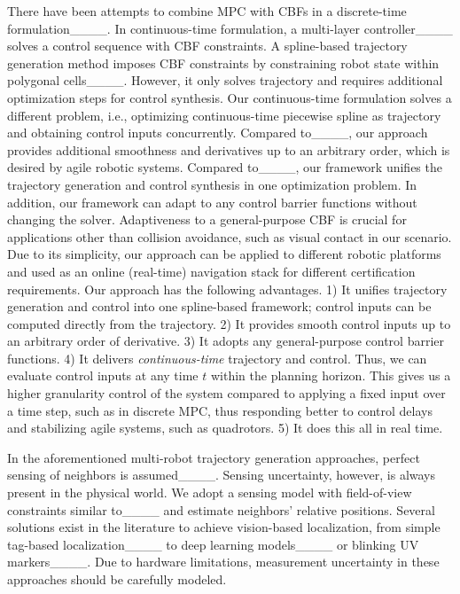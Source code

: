 There have been attempts to combine MPC with CBFs in a discrete-time formulation____. In continuous-time formulation, a multi-layer controller____ solves a control sequence with CBF constraints. A spline-based trajectory generation method imposes CBF constraints by constraining robot state within polygonal cells____. However, it only solves trajectory and requires additional optimization steps for control synthesis. 
Our continuous-time formulation solves a different problem, i.e., optimizing continuous-time piecewise spline as trajectory and obtaining control inputs concurrently. Compared to____, our approach provides additional smoothness and derivatives up to an arbitrary order, which is desired by agile robotic systems. Compared to____, our framework unifies the trajectory generation and control synthesis in one optimization problem. In addition, our framework can adapt to any control barrier functions without changing the solver. Adaptiveness to a general-purpose CBF is crucial for applications other than collision avoidance, such as visual contact in our scenario. Due to its simplicity, our approach can be applied to different robotic platforms and used as an online (real-time) navigation stack for different certification requirements.
Our approach has the following advantages. 1) It unifies  trajectory generation and control into one spline-based framework; control inputs can be computed directly from the trajectory. 2) It provides smooth control inputs up to an arbitrary order of derivative. 3) It adopts any general-purpose control barrier functions. 4) It delivers \emph{continuous-time} trajectory and control. Thus, we can evaluate control inputs at any time $t$ within the planning horizon. This gives us a higher granularity control of the system compared to applying a fixed input over a time step, such as in discrete MPC, thus responding better to control delays and stabilizing agile systems, such as quadrotors. 5) It does this all in real time. 

In the aforementioned multi-robot trajectory generation approaches, perfect sensing of neighbors is assumed____. Sensing uncertainty, however, is always present in the physical world. We adopt a sensing model with field-of-view constraints similar to____ and estimate neighbors' relative positions. Several solutions exist in the literature to achieve vision-based localization, from simple tag-based localization____ to deep learning models____ or blinking UV markers____. Due to hardware limitations, measurement uncertainty in these approaches should be carefully modeled.